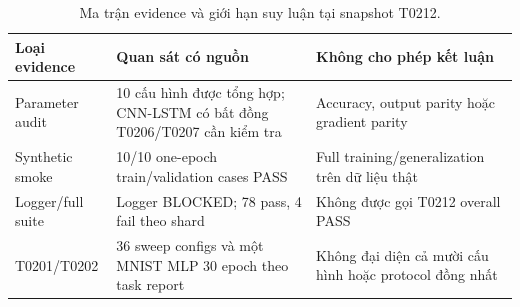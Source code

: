 \begin{table}[htbp]
\centering
\caption{Ma trận evidence và giới hạn suy luận tại snapshot T0212.}
\label{tab:t0212-evidence-matrix}
\begin{tabularx}{\textwidth}{p{}p{}Y}
\toprule Loại evidence & Quan sát có nguồn & Không cho phép kết luận \\
\midrule
Parameter audit & 10 cấu hình được tổng hợp; CNN-LSTM có bất đồng T0206/T0207 cần kiểm tra & Accuracy, output parity hoặc gradient parity \\
Synthetic smoke & 10/10 one-epoch train/validation cases PASS & Full training/generalization trên dữ liệu thật \\
Logger/full suite & Logger BLOCKED; 78 pass, 4 fail theo shard & Không được gọi T0212 overall PASS \\
T0201/T0202 & 36 sweep configs và một MNIST MLP 30 epoch theo task report & Không đại diện cả mười cấu hình hoặc protocol đồng nhất \\
\bottomrule
\end{tabularx}
\end{table}